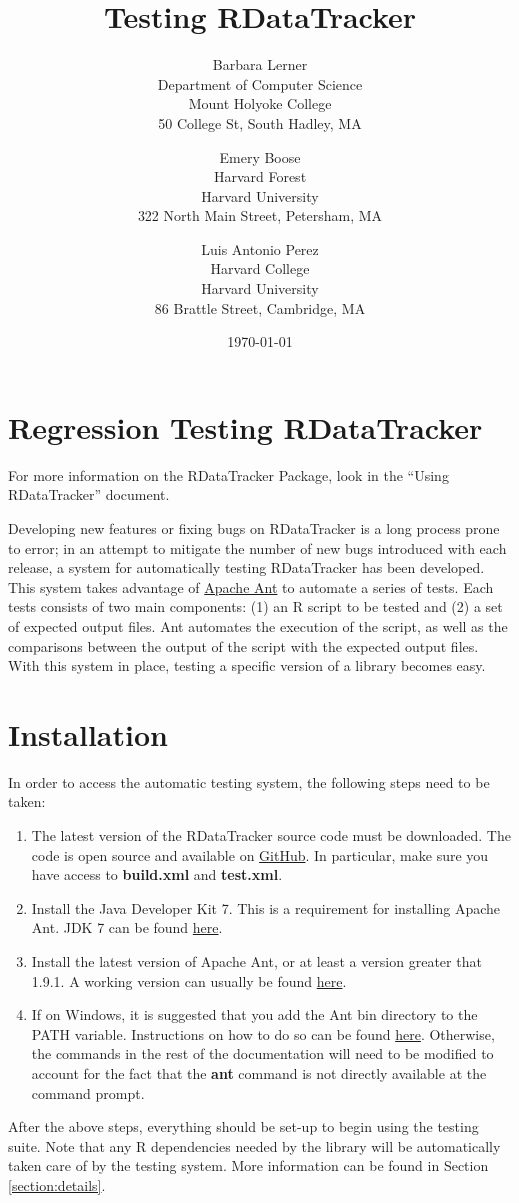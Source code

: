 \documentclass[12pt]{article}
\title{Testing RDataTracker}
\author{
        Barbara Lerner \\
                Department of Computer Science\\
        Mount Holyoke College\\
        50 College St, South Hadley, MA
            \and
        Emery Boose\\
        Harvard Forest\\
        Harvard University\\
        322 North Main Street, Petersham, MA 
        	\and 
        Luis Antonio Perez \\
        Harvard College \\
        Harvard University \\
        86 Brattle Street, Cambridge, MA
}
\date{\today}
\begin{document}
\maketitle

\newpage
\tableofcontents
\newpage
\listoffigures
\newpage

\section{Regression Testing RDataTracker}

For more information on the RDataTracker Package, look in the ``Using RDataTracker'' document.

\bigskip

Developing new features or fixing bugs on RDataTracker is a long process prone to error; in an attempt to mitigate the number of new bugs introduced with each release, a system for automatically testing RDataTracker has been developed. This system takes advantage of \href{http://ant.apache.org/}{Apache Ant} to automate a series of tests. Each tests consists of two main components: (1) an R script to be tested and (2) a set of expected output files. Ant automates the execution of the script, as well as the comparisons between the output of the script with the expected output files. With this system in place, testing a specific version of a library becomes easy.

\section{Installation}
In order to access the automatic testing system, the following steps need to be taken:
\begin{enumerate}
\item The latest version of the RDataTracker source code must be downloaded. The code is open source and available on \href{https://github.com/blernermhc/RDataTracker}{GitHub}. In particular, make sure you have access to \textbf{build.xml} and \textbf{test.xml}.
\item Install the Java Developer Kit 7. This is a requirement for installing Apache Ant. JDK 7 can be found \href{http://www.oracle.com/technetwork/java/javase/downloads/jdk7-downloads-1880260.html}{here}.
\item Install the latest version of Apache Ant, or at least a version greater that 1.9.1. A working version can usually be found \href{http://ant.apache.org/bindownload.cgi}{here}.
\item If on Windows, it is suggested that you add the Ant bin directory to the PATH variable. Instructions on how to do so can be found \href{http://www.computerhope.com/issues/ch000549.htm}{here}. Otherwise, the commands in the rest of the documentation will need to be modified to account for the fact that the \textbf{ant} command is not directly available at the command prompt.
\end{enumerate}
After the above steps, everything should be set-up to begin using the testing suite. Note that any R dependencies needed by the library will be automatically taken care of by the testing system. More information can be found in Section \ref{section:details}.
\end{document}
